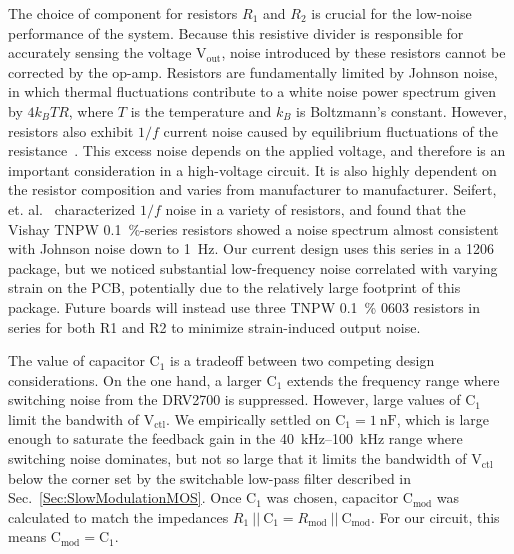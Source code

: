 \documentclass[aip,rsi,reprint]{revtex4-1} %
\begin{document}
The choice of component for resistors $R_1$ and $R_2$ is crucial for the low-noise performance of the system. 
Because this resistive divider is responsible for accurately sensing the voltage $\text{V}_\text{out}$, noise introduced by these resistors cannot be corrected by the op-amp.
Resistors are fundamentally limited by Johnson noise, in which thermal fluctuations contribute to a white noise power spectrum given by $4 k_B T R$, where $T$ is the temperature and $k_B$ is Boltzmann's constant\cite{Horowitz2015a:JN}.
However, resistors also exhibit $1/f$ current noise caused by equilibrium fluctuations of the resistance~\cite{Clarke1974a,Voss1976a}.
This excess noise depends on the applied voltage, and therefore is an important consideration in a high-voltage circuit.
It is also highly dependent on the resistor composition and varies from manufacturer to manufacturer.
Seifert, et. al.~\cite{Seifert2009a} characterized $1/f$ noise in a variety of resistors, and found that the Vishay TNPW \SI{0.1}{\percent}-series resistors showed a noise spectrum almost consistent with Johnson noise down to \SI{1}{\hertz}.
Our current design uses this series in a 1206 package, but we noticed substantial low-frequency noise correlated with varying strain on the PCB, potentially due to the relatively large footprint of this package.
Future boards will instead use three TNPW \SI{0.1}{\percent} 0603 resistors in series for both R1 and R2 to minimize strain-induced output noise.

The value of capacitor $\text{C}_1$ is a tradeoff between two competing design considerations.
On the one hand, a larger $\text{C}_1$ extends the frequency range where switching noise from the DRV2700 is suppressed.
However, large values of $\text{C}_1$ limit the bandwith of $\text{V}_\text{ctl}$.
We empirically settled on $\text{C}_1 = \SI{1}{\nano\farad}$, which is large enough to saturate the feedback gain in the \SI{40}{\kilo\hertz}--\SI{100}{\kilo\hertz} range where switching noise dominates, but not so large that it limits the bandwidth of $\text{V}_\text{ctl}$ below the corner set by the switchable low-pass filter described in Sec.~\ref{Sec:SlowModulationMOS}.
Once $\text{C}_1$ was chosen, capacitor $\text{C}_\text{mod}$ was calculated to match the impedances $R_1~||~\text{C}_1 = R_\text{mod}~||~\text{C}_\text{mod}$.
For our circuit, this means $\text{C}_\text{mod} = \text{C}_1$.
\end{document}
